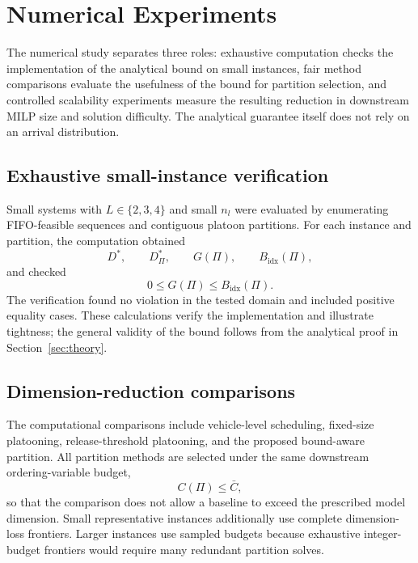 \section{Numerical Experiments}
\label{sec:experiments}

The numerical study separates three roles: exhaustive computation checks the implementation of the analytical bound on small instances, fair method comparisons evaluate the usefulness of the bound for partition selection, and controlled scalability experiments measure the resulting reduction in downstream MILP size and solution difficulty. The analytical guarantee itself does not rely on an arrival distribution.

\subsection{Exhaustive small-instance verification}

Small systems with \(L\in\{2,3,4\}\) and small \(n_l\) were evaluated by enumerating FIFO-feasible sequences and contiguous platoon partitions. For each instance and partition, the computation obtained
\begin{equation}
D^*,\qquad D^*_{\Pi},\qquad G(\Pi),\qquad B_{\mathrm{idx}}(\Pi),
\end{equation}
and checked
\begin{equation}
0\le G(\Pi)\le B_{\mathrm{idx}}(\Pi).
\end{equation}
The verification found no violation in the tested domain and included positive equality cases. These calculations verify the implementation and illustrate tightness; the general validity of the bound follows from the analytical proof in Section~\ref{sec:theory}.

\subsection{Dimension-reduction comparisons}

The computational comparisons include vehicle-level scheduling, fixed-size platooning, release-threshold platooning, and the proposed bound-aware partition. All partition methods are selected under the same downstream ordering-variable budget,
\begin{equation}
C(\Pi)\le \bar C,
\end{equation}
so that the comparison does not allow a baseline to exceed the prescribed model dimension. Small representative instances additionally use complete dimension-loss frontiers. Larger instances use sampled budgets because exhaustive integer-budget frontiers would require many redundant partition solves.

